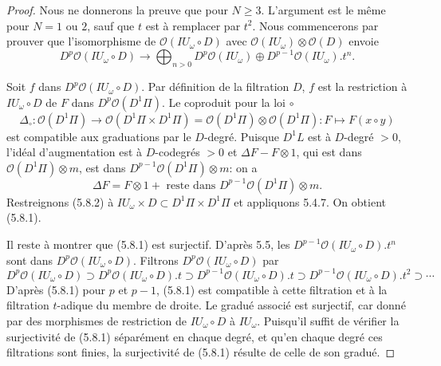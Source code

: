 \documentclass[11pt,a4paper]{article}
\theoremstyle{plain}
\theoremstyle{definition}
\begin{document}
\begin{proof}
Nous ne donnerons la preuve que pour $N \geq 3$. L'argument est le m\^eme pour $N=1$ ou $2$, sauf que $t$ est \`a remplacer par $t^2$. Nous commencerons par prouver que l'isomorphisme de $\mathcal{O}(IU_\omega \circ D)$ avec $\mathcal{O}(IU_\omega) \otimes \mathcal{O}(D)$ envoie
\begin{equation}\label{eq:5.8.1}
D^p \mathcal{O}(IU_\omega \circ D) \to \bigoplus_{n > 0} D^p \mathcal{O}(IU_\omega) \oplus D^{p-1} \mathcal{O}(IU_\omega).t^n.
\end{equation}

Soit $f$ dans $D^p \mathcal{O}(IU_\omega \circ D)$. Par d\'efinition de la filtration $D$, $f$ est la restriction \`a $IU_\omega \circ D$ de $F$ dans $D^p \mathcal{O}(D^1\Pi)$. Le coproduit pour la loi $\circ$
\[
\Delta_\circ: \mathcal{O}(D^1\Pi) \to \mathcal{O}(D^1\Pi \times D^1\Pi) = \mathcal{O}(D^1\Pi) \otimes \mathcal{O}(D^1\Pi): F \mapsto F(x \circ y)
\]
est compatible aux graduations par le $D$-degr\'e. Puisque $D^1L$ est \`a $D$-degr\'e $> 0$, l'id\'eal d'augmentation est \`a $D$-codegr\'es $> 0$ et $\Delta F - F \otimes 1$, qui est dans $\mathcal{O}(D^1\Pi) \otimes m$, est dans $D^{p-1} \mathcal{O}(D^1\Pi) \otimes m$: on a
\begin{equation}\label{eq:5.8.2}
\Delta F = F \otimes 1 + \text{ reste dans } D^{p-1} \mathcal{O}(D^1\Pi) \otimes m.
\end{equation}
Restreignons (5.8.2) \`a $IU_\omega \times D \subset D^1\Pi \times D^1\Pi$ et appliquons 5.4.7. On obtient (5.8.1).

Il reste \`a montrer que (5.8.1) est surjectif. D'apr\`es 5.5, les $D^{p-1} \mathcal{O}(IU_\omega \circ D).t^n$ sont dans $D^p \mathcal{O}(IU_\omega \circ D)$. Filtrons $D^p \mathcal{O}(IU_\omega \circ D)$ par
\[
D^p \mathcal{O}(IU_\omega \circ D) \supset D^p \mathcal{O}(IU_\omega \circ D).t \supset D^{p-1} \mathcal{O}(IU_\omega \circ D).t \supset D^{p-1} \mathcal{O}(IU_\omega \circ D).t^2 \supset \cdots
\]
D'apr\`es (5.8.1) pour $p$ et $p-1$, (5.8.1) est compatible \`a cette filtration et \`a la filtration $t$-adique du membre de droite. Le gradu\'e associ\'e est surjectif, car donn\'e par des morphismes de restriction de $IU_\omega \circ D$ \`a $IU_\omega$. Puisqu'il suffit de v\'erifier la surjectivit\'e de (5.8.1) s\'epar\'ement en chaque degr\'e, et qu'en chaque degr\'e ces filtrations sont finies, la surjectivit\'e de (5.8.1) r\'esulte de celle de son gradu\'e.
\end{proof}
\end{document}
